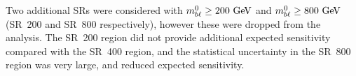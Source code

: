 Two additional SRs were considered with $\MBL^0 \geq 200 \GeV$ and
$\MBL^0 \geq 800 \GeV$ (SR~200 and SR~800 respectively), however these were
dropped from the analysis.
The SR~200 region did not provide additional expected sensitivity compared with
the SR~400 region, and the statistical uncertainty in the SR~800 region was very
large, and reduced expected sensitivity.
% 

